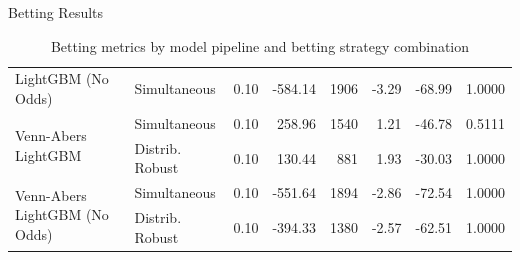 \documentclass[aspectratio=169,xcolor=dvipsnames]{beamer}
\begin{document}
\begin{frame}{Betting Results}
\begin{table}[]
\begin{tabular}{@{}llrrrrrr@{}}
    LightGBM (No Odds)                                        & Simultaneous                 & 0.10     & -584.14     & 1906       & -3.29      & -68.99            & 1.0000                  \\
    \multirow{2}{*}{Venn-Abers LightGBM}                      & Simultaneous                  & 0.10     & 258.96      & 1540       & 1.21       & -46.78            & 0.5111                  \\
                                                              & Distrib. Robust       & 0.10     & 130.44      & 881        & 1.93       & -30.03            & 1.0000                  \\
    \multirow{2}{*}{Venn-Abers LightGBM (No Odds)}            & Simultaneous                 & 0.10     & -551.64     & 1894       & -2.86      & -72.54            & 1.0000                  \\
                                                              & Distrib. Robust        & 0.10     & -394.33     & 1380      & -2.57      & -62.51            & 1.0000                  \\ \bottomrule
    \end{tabular}
    \caption{Betting metrics by model pipeline and betting strategy combination}
    \end{table}
    \normalsize
\end{frame}

\end{document}
